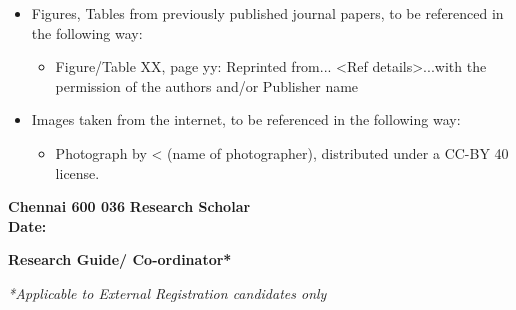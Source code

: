 \documentclass[MS]{iitmdiss}
\newcommand\blankpage{%
    \null
    \thispagestyle{empty}%
    \addtocounter{page}{-1}%
    \newpage}
\begin{document}
\vspace{-0.5cm}
\begin{itemize}
    \item Figures, Tables from previously published journal papers, to be referenced in the following way:
    \begin{itemize}
        \item Figure/Table XX, page yy: Reprinted from... <Ref details>...with the permission of the authors and/or Publisher name
    \end{itemize}
    \item Images taken from the internet, to be referenced in the following way:
    \begin{itemize}
        \item Photograph by < (name of photographer), distributed under a CC-BY 40 license.
    \end{itemize}
\end{itemize}

\vspace*{-0.3in}

\hspace{-0.6cm}\textbf{Chennai 600 036} \hspace{7.5cm} \textbf{Research Scholar}\\
\vspace{-1.8cm}\hspace{-0.6cm}\textbf{Date:}\\
\begin{flushright}
\textbf{Research Guide/ Co-ordinator*}
\end{flushright}
\textit{*Applicable to External Registration candidates only}

\iffalse
\begin{singlespacing}
\hspace*{-0.25in}
\parbox{2.5in}{
\noindent {\bf Prof.~1} \\
\noindent Research Guide \\ 
\noindent Professor \\
\noindent Dept. of Physics\\
\noindent IIT-Madras, 600 036 \\
} 
\hspace*{1.0in} 
\end{singlespacing}
\vspace*{0.25in}
\noindent Place: Chennai\\
Date: 19th January 2009 
\fi
\pagebreak
\afterpage{\blankpage}
\listofpublications
\end{document}
